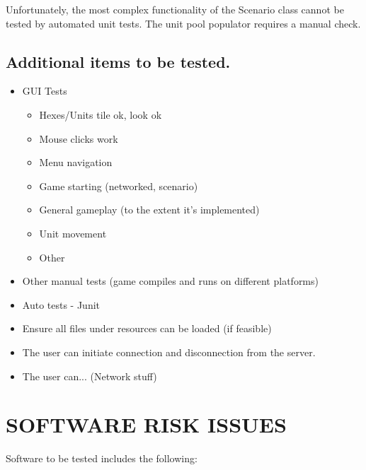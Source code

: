 {Unfortunately, the most complex functionality of the Scenario class 
cannot be tested by automated unit tests. The unit pool populator requires 
a manual check.

\subsection	{Additional items to be tested.}

{\color{black}
\begin{itemize}
\item GUI Tests
\begin{itemize}
\item Hexes/Units tile ok, look ok
\item Mouse clicks work
\item Menu navigation
\item Game starting (networked, scenario)
\item General gameplay (to the extent it's implemented)
\item Unit movement
\item Other
\end{itemize}
\item Other manual tests (game compiles and runs on different platforms)
\item Auto tests - Junit
\item Ensure all files under resources can be loaded (if feasible)
\item The user can initiate connection and disconnection from the server.
\item The user can... (Network stuff)
\end{itemize}
}

\section[SOFTWARE RISK ISSUES]{\bfseries\color{black} SOFTWARE RISK ISSUES}
{\color{black}
Software to be tested includes the following:

}}
